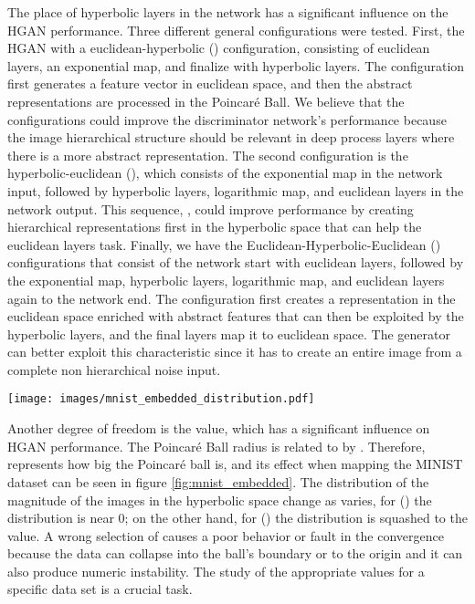 \documentclass[journal]{IEEEtran}
\begin{document}
The place of hyperbolic layers in the network has a significant influence on the HGAN performance. Three different general configurations were tested. First, the HGAN with a euclidean-hyperbolic () configuration, consisting of euclidean layers, an exponential map, and finalize with hyperbolic layers. The  configuration first generates a feature vector in euclidean space, and then the abstract representations are processed in the Poincaré Ball. We believe that the  configurations could improve the discriminator network's performance because the image hierarchical structure should be relevant in deep process layers where there is a more abstract representation. The second configuration is the hyperbolic-euclidean (), which consists of the exponential map in the network input, followed by hyperbolic layers, logarithmic map, and euclidean layers in the network output. This sequence, , could improve performance by creating hierarchical representations first in the hyperbolic space that can help the euclidean layers task. Finally, we have the Euclidean-Hyperbolic-Euclidean () configurations that consist of the network start with euclidean layers, followed by the exponential map, hyperbolic layers, logarithmic map, and euclidean layers again to the network end. The  configuration first creates a representation in the euclidean space enriched with abstract features that can then be exploited by the hyperbolic layers, and the final layers map it to euclidean space. The generator can better exploit this characteristic since it has to create an entire image from a complete non hierarchical noise input. \newline


 \begin{figure*}[h]
\begin{center}
  \centering
  \texttt{[image: images/mnist\_embedded\_distribution.pdf]}
  \caption{Poincaré Ball embedded vectorized MNIST () distribution, from equation \eqref{exp0} normalized respect the Poincaré ball radius  using the function  .}
  \label{fig:mnist_embedded}
\end{center}
\end{figure*}

Another degree of freedom is the  value, which has a significant influence on HGAN performance. The Poincaré Ball radius  is related to  by . Therefore,  represents how big the Poincaré ball is, and its effect when mapping the MINIST dataset can be seen in figure \ref{fig:mnist_embedded}. The distribution of the magnitude of the images in the hyperbolic space change as  varies, for  () the distribution is near 0; on the other hand, for  () the distribution is squashed to the  value. A wrong selection of  causes a poor behavior or fault in the convergence because the data can collapse into the ball's boundary or to the origin and it can also produce numeric instability. The study of the appropriate  values for a specific data set is a crucial task.\newline
\end{document}
